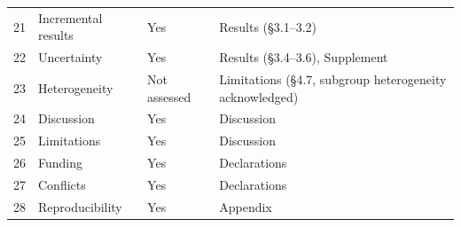 \documentclass[11pt,a4paper]{article}
\begin{document}
\begin{table}[H]
\begin{tabularx}{\linewidth}{@{}p{0.7cm}X p{1.6cm}X@{}}
21 & Incremental results & Yes & Results ({\S}3.1--3.2) \\
22 & Uncertainty & Yes & Results ({\S}3.4--3.6), Supplement \\
23 & Heterogeneity & Not assessed & Limitations ({\S}4.7, subgroup heterogeneity acknowledged) \\
24 & Discussion & Yes & Discussion \\
25 & Limitations & Yes & Discussion \\
26 & Funding & Yes & Declarations \\
27 & Conflicts & Yes & Declarations \\
28 & Reproducibility & Yes & Appendix \\
\bottomrule
\end{tabularx}
\end{table}

\newpage

\end{document}
